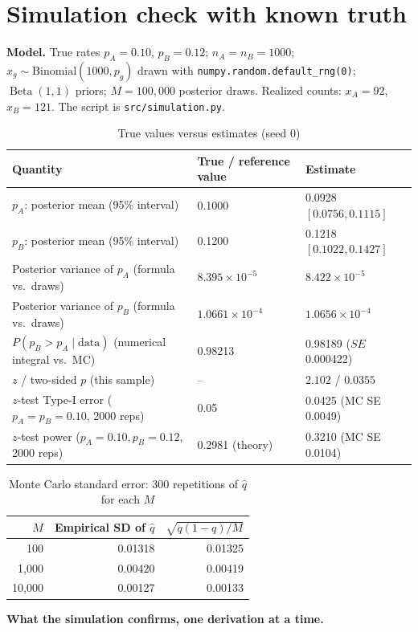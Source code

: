 \documentclass[11pt]{article}
\newcommand{\Beta}{\operatorname{Beta}}
\begin{document}
\section{Simulation check with known truth}
\label{sec:sim}
\textbf{Model.} True rates $p_A=0.10$, $p_B=0.12$; $n_A=n_B=1000$; $x_g\sim\mathrm{Binomial}(1000,p_g)$ drawn with \texttt{numpy.random.default\_rng(0)}; $\Beta(1,1)$ priors; $M=100{,}000$ posterior draws. Realized counts: $x_A=92$, $x_B=121$. The script is \texttt{src/simulation.py}.
\begin{table}[H]
\centering
\caption{True values versus estimates (seed 0)}
\begin{tabular}{lll}
\toprule
Quantity & True / reference value & Estimate\\
\midrule
$p_A$: posterior mean (95\% interval) & 0.1000 & 0.0928 $[0.0756,0.1115]$\\
$p_B$: posterior mean (95\% interval) & 0.1200 & 0.1218 $[0.1022,0.1427]$\\
Posterior variance of $p_A$ (formula vs.\ draws) & $8.395\times10^{-5}$ & $8.422\times10^{-5}$\\
Posterior variance of $p_B$ (formula vs.\ draws) & $1.0661\times10^{-4}$ & $1.0656\times10^{-4}$\\
$P(p_B>p_A\mid\text{data})$ (numerical integral vs.\ MC) & 0.98213 & 0.98189 ($SE$ 0.000422)\\
$z$ / two-sided $p$ (this sample) & -- & $2.102$ / $0.0355$\\
$z$-test Type-I error ($p_A=p_B=0.10$, 2000 reps) & 0.05 & 0.0425 (MC SE 0.0049)\\
$z$-test power ($p_A=0.10,p_B=0.12$, 2000 reps) & 0.2981 (theory) & 0.3210 (MC SE 0.0104)\\
\bottomrule
\end{tabular}
\end{table}
\begin{table}[H]
\centering
\caption{Monte Carlo standard error: 300 repetitions of $\hat q$ for each $M$}
\begin{tabular}{rrr}
\toprule
$M$ & Empirical SD of $\hat q$ & $\sqrt{q(1-q)/M}$\\
\midrule
100 & 0.01318 & 0.01325\\
1{,}000 & 0.00420 & 0.00419\\
10{,}000 & 0.00127 & 0.00133\\
\bottomrule
\end{tabular}
\end{table}
\textbf{What the simulation confirms, one derivation at a time.}
\end{document}

